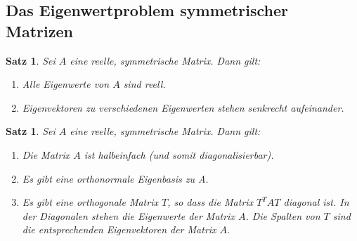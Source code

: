 \documentclass[9pt,fleqn,ngerman,article]{memoir}
\newtheorem{satz}[lemma]{Satz}
\begin{document}
\begin{multicols*}{3}
		\subsection{Das Eigenwertproblem symmetrischer Matrizen} %
			\begin{satz}
				Sei $A$ eine reelle, symmetrische Matrix. Dann gilt:
				\renewcommand{\labelenumi}{\textup{\roman{enumi})}}
				\begin{enumerate}
					\item Alle Eigenwerte von $A$ sind reell.
					\item Eigenvektoren zu verschiedenen Eigenwerten stehen senkrecht aufeinander.
				\end{enumerate}
			\end{satz}
			
			\begin{satz}
				Sei $A$ eine reelle, symmetrische Matrix. Dann gilt:
				\renewcommand{\labelenumi}{\textup{\roman{enumi})}}
				\begin{enumerate}
					\item Die Matrix $A$ ist halbeinfach (und somit diagonalisierbar).
					\item Es gibt eine orthonormale Eigenbasis zu A.
					\item Es gibt eine orthogonale Matrix $T$, so dass die Matrix $T^T AT$ diagonal ist. In der Diagonalen stehen die Eigenwerte der Matrix $A$. Die Spalten von $T$ sind die entsprechenden Eigenvektoren der Matrix $A$.
				\end{enumerate}
			\end{satz}
	
	
	\end{multicols*}
	
	\printindex
\end{document}
